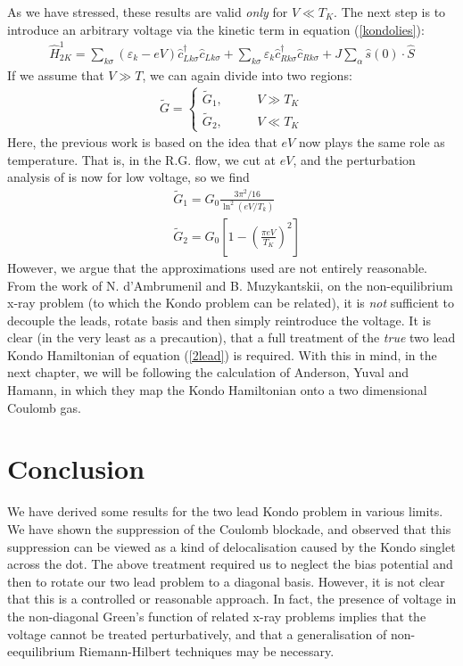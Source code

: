 \documentclass[twocolumn]{el-author}
\newcommand{\hH}{\hat{H}}
\newcommand{\D}{^\dagger}
\begin{document}
As we have stressed, these results are valid \emph{only} for $V\ll T_{K}$.  The next step is to introduce an arbitrary voltage via the kinetic term in equation (\ref{kondolies}):
\begin{align}
  \hH_{2K}^{1}=\sum_{k\sigma}(\varepsilon_{k}-eV)\hat{c}_{L k\sigma}\D\hat{c}_{L k\sigma}+
  \sum_{k\sigma}\varepsilon_{k}\hat{c}_{R k\sigma}\D\hat{c}_{R k\sigma}+
  J\sum_{\alpha}\hat{s}(0)\cdot\hat{S}
\end{align}
If we assume that $V\gg T$, we can again divide into two regions:
\begin{align}
  \tilde{G}=\left\{\begin{array}{cc}
     \tilde{G}_{1}, & \;\;\;\;\;\;\;V\gg T_{K} \\
     \tilde{G}_{2}, & \;\;\;\;\;\;\;V\ll T_{K}
   \end{array}\right.
\end{align}
Here, the previous work is based on the idea that $eV$ now plays the same role as temperature.  That is, in the R.G. flow, we cut at $eV$, and the perturbation analysis of \cite{3} is now for low voltage, so we find
\begin{align}
     &\tilde{G}_{1}=G_{0}\frac{3\pi^{2}/16}{\ln^{2}(eV/T_{k})}\nonumber\\
     &\tilde{G}_{2}=G_{0}\left[1-\left(\frac{\pi eV}{T_{K}}\right)^{2}\right]
\end{align}
However, we argue that the approximations used are not entirely reasonable.  From the work of N. d'Ambrumenil and B. Muzykantskii, on the non-equilibrium x-ray problem (to which the Kondo problem can be related), it is \emph{not} sufficient to decouple the leads, rotate basis and then simply reintroduce the voltage.  It is clear (in the very least as a precaution), that a full treatment of the \emph{true} two lead Kondo Hamiltonian of equation (\ref{2lead}) is required.  With this in mind, in the next chapter, we will be following the calculation of Anderson, Yuval and Hamann, in which they map the Kondo Hamiltonian onto a two dimensional Coulomb gas.


\section{Conclusion}
We have derived some results for the two lead Kondo problem in various limits.  We have shown the suppression of the Coulomb blockade, and observed that this suppression can be viewed as a kind of delocalisation caused by the Kondo singlet across the dot.  The above treatment required us to neglect the bias potential and then to rotate our two lead problem to a diagonal basis.  However, it is not clear that this is a controlled or reasonable approach.  In fact, the presence of voltage in the non-diagonal Green's function of related x-ray problems implies that the voltage cannot be treated perturbatively, and that a generalisation of non-eequilibrium Riemann-Hilbert techniques may be necessary.
\vskip3pt
\end{document}
